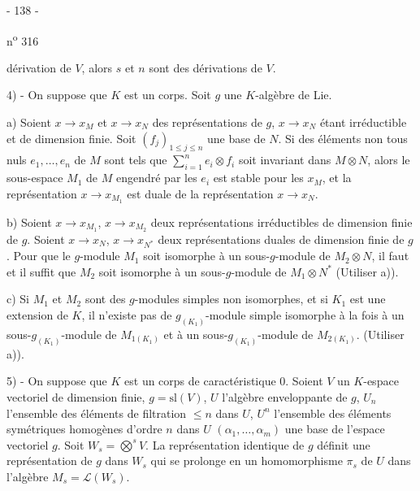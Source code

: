 \begin{center}- 138 -\end{center}
\hfill n\textsuperscript{o} 316

dérivation de $V$, alors $s$ et $n$ sont des dérivations de $V$.

4) - On suppose que $K$ est un corps. Soit $g$ une $K$-algèbre de Lie.

a) Soient $x\longrightarrow x_M$ et $x\longrightarrow x_N$ des représentations de $g$, $x\longrightarrow x_N$ étant irréductible et de dimension finie. Soit $(f_j)_{1\leq j\leq n}$ une base de $N$. Si des éléments non tous nuls $e_1,\ldots,e_n$ de $M$ sont tels que $\sum_{i=1}^{n}e_i\otimes f_i$ soit invariant dans $M\otimes N$, alors le sous-espace $M_1$ de $M$ engendré par les $e_i$ est stable pour les $x_M$, et la représentation $x\longrightarrow x_{M_1}$ est duale de la représentation $x\longrightarrow x_N$.

b) Soient $x\longrightarrow x_{M_1}$, $x\longrightarrow x_{M_2}$ deux représentations irréductibles de dimension finie de $g$. Soient $x\longrightarrow x_N$, $x\longrightarrow x_{N^*}$ deux représentations duales de dimension finie de $g$. Pour que le $g$-module $M_1$ soit isomorphe à un sous-$g$-module de $M_2\otimes N$, il faut et il suffit que $M_2$ soit isomorphe à un sous-$g$-module de $M_1\otimes N^*$ (Utiliser a)).

c) Si $M_1$ et $M_2$ sont des $g$-modules simples non isomorphes, et si $K_1$ est une extension de $K$, il n'existe pas de $g_{(K_1)}$-module simple isomorphe à la fois à un sous-$g_{(K_1)}$-module de $M_{1(K_1)}$ et à un sous-$g_{(K_1)}$-module de $M_{2(K_1)}$. (Utiliser a)).

\margin{\P}
5) - On suppose que $K$ est un corps de caractéristique $0$. Soient $V$ un $K$-espace vectoriel de dimension finie, $g=\mathrm{sl}(V)$, $U$ l'algèbre enveloppante de $g$, $U_n$ l'ensemble des éléments de filtration $\leq n$ dans $U$, $U^n$ l'ensemble des éléments symétriques homogènes d'ordre $n$ dans $U$ $(\alpha_1,\ldots,\alpha_m)$ une base de l'espace vectoriel $g$. Soit $W_s=\overset{s}{\bigotimes}V$. La représentation identique de $g$ définit une représentation de $g$ dans $W_s$ qui se prolonge en un homomorphisme $\pi_s$ de $U$ dans l'algèbre $M_s=\mathcal L(W_s)$.
